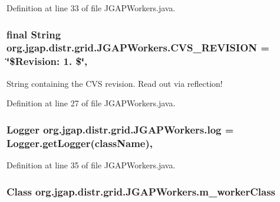 Definition at line 33 of file J\-G\-A\-P\-Workers.\-java.

\hypertarget{classorg_1_1jgap_1_1distr_1_1grid_1_1_j_g_a_p_workers_aeb1c1988740e912a98158ace610d68ed}{
\subsubsection[{C\-V\-S\-\_\-\-R\-E\-V\-I\-S\-I\-O\-N}]{\setlength{\rightskip}{0pt plus 5cm}final String org.\-jgap.\-distr.\-grid.\-J\-G\-A\-P\-Workers.\-C\-V\-S\-\_\-\-R\-E\-V\-I\-S\-I\-O\-N = \char`\"{}\$Revision\-: 1. \$\char`\"{}\hspace{0.3cm}{\ttfamily [static]}, {\ttfamily [private]}}}\label{classorg_1_1jgap_1_1distr_1_1grid_1_1_j_g_a_p_workers_aeb1c1988740e912a98158ace610d68ed}
String containing the C\-V\-S revision. Read out via reflection! 

Definition at line 27 of file J\-G\-A\-P\-Workers.\-java.

\hypertarget{classorg_1_1jgap_1_1distr_1_1grid_1_1_j_g_a_p_workers_a5f6bcf7484fb1867a587776b8581b6d2}{
\subsubsection[{log}]{\setlength{\rightskip}{0pt plus 5cm}Logger org.\-jgap.\-distr.\-grid.\-J\-G\-A\-P\-Workers.\-log = Logger.\-get\-Logger({\bf class\-Name})\hspace{0.3cm}{\ttfamily [static]}, {\ttfamily [private]}}}\label{classorg_1_1jgap_1_1distr_1_1grid_1_1_j_g_a_p_workers_a5f6bcf7484fb1867a587776b8581b6d2}


Definition at line 35 of file J\-G\-A\-P\-Workers.\-java.

\hypertarget{classorg_1_1jgap_1_1distr_1_1grid_1_1_j_g_a_p_workers_a0618d4fe65a2f6e989cb5649ff9576f9}{
\subsubsection[{m\-\_\-worker\-Class}]{\setlength{\rightskip}{0pt plus 5cm}Class org.\-jgap.\-distr.\-grid.\-J\-G\-A\-P\-Workers.\-m\-\_\-worker\-Class\hspace{0.3cm}{\ttfamily [private]}}}\label{classorg_1_1jgap_1_1distr_1_1grid_1_1_j_g_a_p_workers_a0618d4fe65a2f6e989cb5649ff9576f9}


